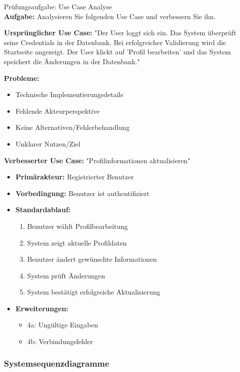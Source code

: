 \begin{example2}{Prüfungsaufgabe: Use Case Analyse}\\
\textbf{Aufgabe:} Analysieren Sie folgenden Use Case und verbessern Sie ihn.

\textbf{Ursprünglicher Use Case:}
"Der User loggt sich ein. Das System überprüft seine Credentials in der Datenbank. 
Bei erfolgreicher Validierung wird die Startseite angezeigt. Der User klickt auf 'Profil bearbeiten' 
und das System speichert die Änderungen in der Datenbank."

\textbf{Probleme:}
\begin{itemize}
    \item Technische Implementierungsdetails
    \item Fehlende Akteurperspektive
    \item Keine Alternativen/Fehlerbehandlung
    \item Unklarer Nutzen/Ziel
\end{itemize}

\textbf{Verbesserter Use Case:}
"Profilinformationen aktualisieren"
\begin{itemize}
    \item \textbf{Primärakteur:} Registrierter Benutzer
    \item \textbf{Vorbedingung:} Benutzer ist authentifiziert
    \item \textbf{Standardablauf:}
    \begin{enumerate}
        \item Benutzer wählt Profilbearbeitung
        \item System zeigt aktuelle Profildaten
        \item Benutzer ändert gewünschte Informationen
        \item System prüft Änderungen
        \item System bestätigt erfolgreiche Aktualisierung
    \end{enumerate}
    \item \textbf{Erweiterungen:}
    \begin{itemize}
        \item 4a: Ungültige Eingaben
        \item 4b: Verbindungsfehler
    \end{itemize}
\end{itemize}
\end{example2}


\columnbreak

\subsubsection{Systemsequenzdiagramme}

